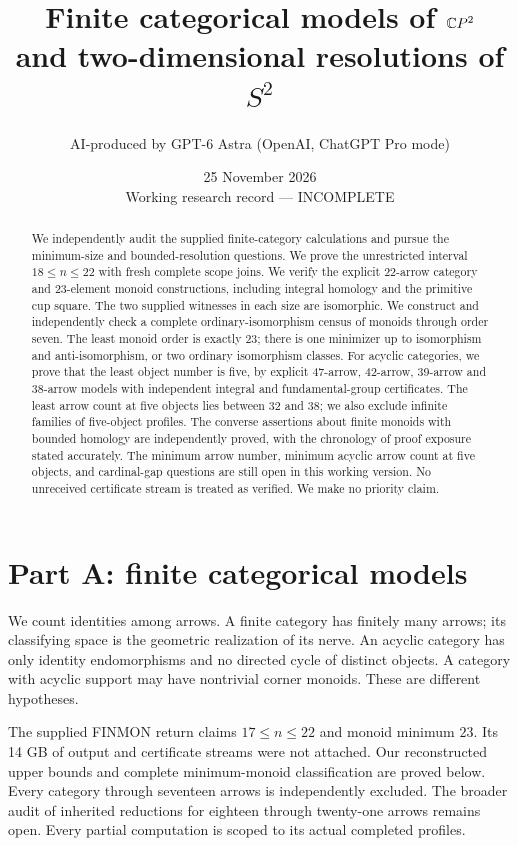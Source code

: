 \documentclass[11pt]{article}
\title{Finite categorical models of $\mathbb{C}P^2$\\and two-dimensional resolutions of $S^2$}
\author{AI-produced by GPT-6 Astra (OpenAI, ChatGPT Pro mode)}
\date{25 November 2026\\Working research record --- INCOMPLETE}
\begin{document}
\maketitle
\begin{abstract}
We independently audit the supplied finite-category calculations and pursue
the minimum-size and bounded-resolution questions. We prove the unrestricted interval $18\le n\le22$ with fresh complete scope joins. We verify the explicit
22-arrow category and 23-element monoid constructions, including integral
homology and the primitive cup square. The two supplied witnesses in each
size are isomorphic. We construct and independently check a complete
ordinary-isomorphism census of monoids through order seven. The least
monoid order is exactly 23; there is one minimizer up to isomorphism and
anti-isomorphism, or two ordinary isomorphism classes. For acyclic
categories, we prove that the least object number is five, by explicit
47-arrow, 42-arrow, 39-arrow and 38-arrow models with independent integral and fundamental-group
certificates. The least arrow count at five objects lies between 32 and 38;
we also exclude infinite families of five-object profiles. The converse
assertions about finite monoids with bounded homology are independently
proved, with the chronology of proof exposure stated accurately. The
minimum arrow number, minimum acyclic arrow count at five objects, and
cardinal-gap questions are still open
in this working version. No unreceived certificate stream is treated as
verified. We make no priority claim.
\end{abstract}
\tableofcontents
\section{Part A: finite categorical models}
\label{CP2:partA}
We count identities among arrows. A finite category has finitely many
arrows; its classifying space is the geometric realization of its nerve.
An acyclic category has only identity endomorphisms and no directed cycle
of distinct objects. A category with acyclic support may have nontrivial
corner monoids. These are different hypotheses.

The supplied FINMON return claims $17\leq n\leq22$ and monoid minimum
$23$. Its 14 GB of output and certificate streams were not attached.
Our reconstructed upper bounds and complete minimum-monoid classification
are proved below. Every category through seventeen arrows is independently
excluded. The broader audit of inherited reductions for eighteen through
twenty-one arrows remains open. Every partial computation is scoped to
its actual completed profiles.
\end{document}
